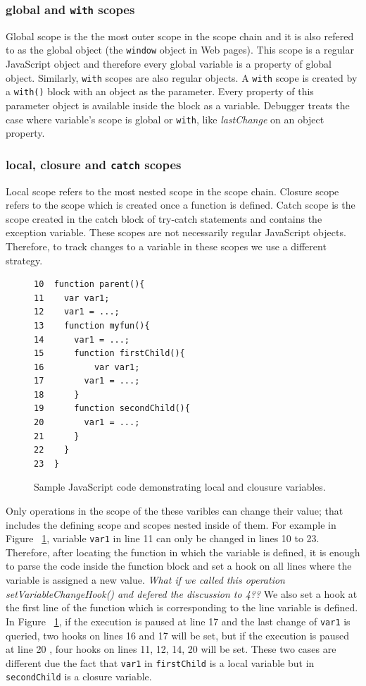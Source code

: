 \documentclass[preprint]{sigplanconf}
\begin{document}
\subsubsection{global and \texttt{with} scopes}
Global scope is the the most outer scope in the scope chain and it is
also refered to as the global object (the \texttt{window}
object in Web pages). This scope is a regular JavaScript object and therefore every
global variable is a property of global object. Similarly,
 \texttt{with} scopes are also regular objects. A \texttt{with}
scope is created by a \texttt{with()} block with an object as the
parameter. Every property of this parameter object is available inside the
block as a variable. Debugger treats the case where variable's scope
is global or \texttt{with}, like \textit{lastChange} on an object
property.

\subsubsection{local, closure and \texttt{catch} scopes}
Local scope refers to the most nested scope in the scope
chain. Closure scope refers to the scope which is created once a
function is defined. Catch scope is the scope created in the catch
block of try-catch statements and contains the exception
variable. These scopes are not necessarily regular JavaScript
objects. Therefore, to track changes to a variable in these scopes we
use a different strategy.

\begin{figure}[htp]
\begin{verbatim}
10  function parent(){
11    var var1;
12    var1 = ...;
13    function myfun(){
14      var1 = ...;
15      function firstChild(){
16       	var var1;
17        var1 = ...;
18      }  
19      function secondChild(){
20        var1 = ...;			      
21      }
22    }  
23  }    
\end{verbatim}
\caption{Sample JavaScript code demonstrating local and clousure variables.}
\label{fig:js-closure}
\end{figure}

Only operations in the scope of the these varibles can change their value; that includes the defining scope and scopes nested inside of them.
For example in Figure
~\ref{fig:js-closure}, variable \texttt{var1} in line 11 can only be
changed in lines 10 to 23. Therefore, after locating the function in
which the variable is defined, it is enough to parse the code inside
the function block and set a hook on all lines where the variable is
assigned a new value. \textit{What if we called this operation setVariableChangeHook() and defered the discussion to 4??}
We also set a hook at the first line of the function which is
corresponding to the line variable is defined. In Figure
~\ref{fig:js-closure}, if the execution is paused at line 17 and the
last change of \texttt{var1} is queried, two hooks on lines 16 and 17
will be set, but if the execution is paused at line 20 , four hooks on
lines 11, 12, 14, 20 will be set. These two cases are different due
the fact that \texttt{var1} in \texttt{firstChild} is a local variable
but in \texttt{secondChild} is a closure variable.
\end{document}
